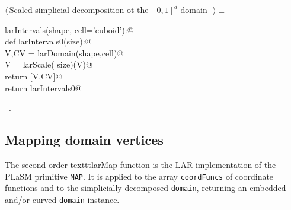 \documentclass[11pt,oneside]{article}	%
\begin{document}
\begin{flushleft} \small \label{scrap2}
$\langle\,$Scaled simplicial decomposition ot the $[0,1]^d$ domain\nobreak\ {\footnotesize {}}$\,\rangle\equiv$
\vspace{-1ex}
\begin{list}{}{} \item
\mbox{}\verb@def larIntervals(shape, cell='cuboid'):@\\
\mbox{}\verb@   def larIntervals0(size):@\\
\mbox{}\verb@      V,CV = larDomain(shape,cell)@\\
\mbox{}\verb@      V = larScale( size)(V)@\\
\mbox{}\verb@      return [V,CV]@\\
\mbox{}\verb@   return larIntervals0@\\
\mbox{}\verb@@{\NWsep}
\end{list}
\vspace{-1ex}
\footnotesize\addtolength{\baselineskip}{-1ex}
\begin{list}{}{\setlength{\itemsep}{-\parsep}\setlength{\itemindent}{-\leftmargin}}
\item \NWtxtMacroRefIn\ .
\end{list}
\end{flushleft}

\subsection{Mapping domain vertices}
The second-order texttt{larMap} function is the LAR implementation of the PLaSM primitive \texttt{MAP}.
It is applied to the array \texttt{coordFuncs} of coordinate functions and to the simplicially decomposed  \texttt{domain}, returning an embedded and/or curved \texttt{domain} instance.
\end{document}
